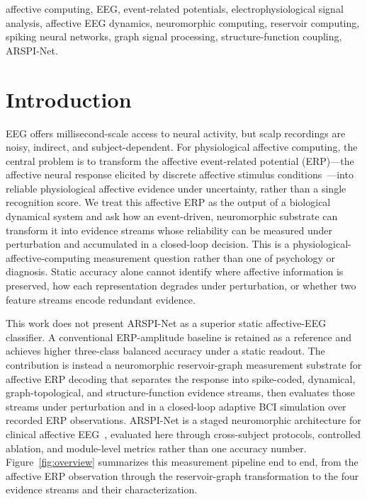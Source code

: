 \documentclass[journal]{IEEEtran}
\begin{document}
\begin{IEEEkeywords}
affective computing, EEG, event-related potentials, electrophysiological signal analysis, affective EEG dynamics, neuromorphic computing, reservoir computing, spiking neural networks, graph signal processing, structure-function coupling, ARSPI-Net.
\end{IEEEkeywords}

\section{Introduction}
EEG offers millisecond-scale access to neural activity, but scalp recordings are noisy, indirect, and subject-dependent. For physiological affective computing, the central problem is to transform the affective event-related potential (ERP)---the affective neural response elicited by discrete affective stimulus conditions~\cite{ding2023tsception}---into reliable physiological affective evidence under uncertainty, rather than a single recognition score. We treat this affective ERP as the output of a biological dynamical system and ask how an event-driven, neuromorphic substrate can transform it into evidence streams whose reliability can be measured under perturbation and accumulated in a closed-loop decision. This is a physiological-affective-computing measurement question rather than one of psychology or diagnosis. Static accuracy alone cannot identify where affective information is preserved, how each representation degrades under perturbation, or whether two feature streams encode redundant evidence.

This work does not present ARSPI-Net as a superior static affective-EEG classifier. A conventional ERP-amplitude baseline is retained as a reference and achieves higher three-class balanced accuracy under a static readout. The contribution is instead a neuromorphic reservoir-graph measurement substrate for affective ERP decoding that separates the response into spike-coded, dynamical, graph-topological, and structure-function evidence streams, then evaluates those streams under perturbation and in a closed-loop adaptive BCI simulation over recorded ERP observations. ARSPI-Net is a staged neuromorphic architecture for clinical affective EEG~\cite{lane2023arspi,lane2024arspi}, evaluated here through cross-subject protocols, controlled ablation, and module-level metrics rather than one accuracy number. Figure~\ref{fig:overview} summarizes this measurement pipeline end to end, from the affective ERP observation through the reservoir-graph transformation to the four evidence streams and their characterization.
\end{document}
